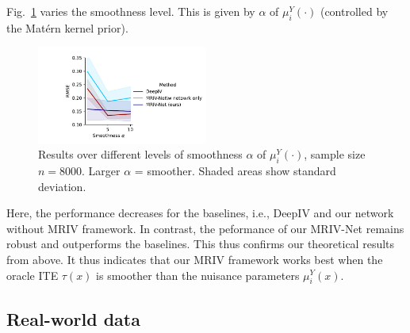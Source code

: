 \documentclass[nonatbib]{article}
\newcommand{\frameworkname}{MRIV\xspace}
\newcommand{\modelname}{\mbox{MRIV-Net}\xspace}
\theoremstyle{definition}
\theoremstyle{plain}
\begin{document}
Fig.~\ref{fig:plt_smoothness} varies the smoothness level. This is given by $\alpha$ of $\mu_i^Y(\cdot)$ (controlled by the Matérn kernel prior).
\begin{figure}
\vspace{-0.5cm}
 \begin{center}
\includegraphics[width=0.5\textwidth]{img/plot_smoothness.pdf}
\end{center}
\vspace{-0.5cm}
\caption{Results over different levels of smoothness $\alpha$  of $\mu_i^Y(\cdot)$, sample size $n=8000$. Larger $\alpha$ = smoother. Shaded areas show standard deviation.}
\vspace{-1.3cm}
\label{fig:plt_smoothness}
\end{figure}
Here, the performance decreases for the baselines, i.e., DeepIV and our network without \frameworkname framework. In contrast, the peformance of our \modelname remains robust and outperforms the baselines. This thus confirms our theoretical results from above. It thus indicates that our \frameworkname framework works best when the oracle ITE $\tau(x)$ is smoother than the nuisance parameters $\mu_i^Y(x)$.

\subsection{Real-world data}\label{sec:exp_real}
\end{document}
